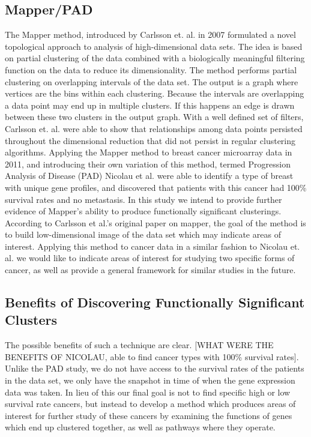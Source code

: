\documentclass[preprint,10pt]{elsarticle}
\begin{document}
\subsection{Mapper/PAD}
The Mapper method, introduced by Carlsson et. al. in 2007 \cite{mapper} formulated a novel topological approach to analysis of high-dimensional data sets. The idea is based on partial clustering of the data combined with a biologically meaningful filtering function on the data to reduce its dimensionality. The method performs partial clustering on overlapping intervals of the data set. The output is a graph where vertices are the bins within each clustering. Because the intervals are overlapping a data point may end up in multiple clusters. If this happens an edge is drawn between these two clusters in the output graph. With a well defined set of filters, Carlsson et. al. were able to show that relationships among data points persisted throughout the dimensional reduction that did not persist in regular clustering algorithms. Applying the Mapper method to breast cancer microarray data in 2011, and introducing their own variation of this method, termed Progression Analysis of Disease (PAD) Nicolau et al. \cite{nicolau} were able to identify a type of breast with unique gene profiles, and discovered that patients with this cancer had 100\% survival rates and no metastasis. In this study we intend to provide further evidence of Mapper's ability to produce functionally significant clusterings. According to Carlsson et al.'s original paper on mapper, the goal of the method is to build low-dimensional image of the data set which may indicate areas of interest. Applying this method to cancer data in a similar fashion to Nicolau et. al. we would like to indicate areas of interest for studying two specific forms of cancer, as well as provide a general framework for similar studies in the future. 

\subsection{Benefits of Discovering Functionally Significant Clusters}
The possible benefits of such a technique are clear. [WHAT WERE THE BENEFITS OF NICOLAU, able to find cancer types with 100\% survival rates]. Unlike the PAD study, we do not have access to the survival rates of the patients in the data set, we only have the snapshot in time of when the gene expression data was taken. In lieu of this our final goal is not to find specific high or low survival rate cancers, but instead to develop a method which produces areas of interest for further study of these cancers by examining the functions of genes which end up clustered together, as well as pathways where they operate.
\end{document}
